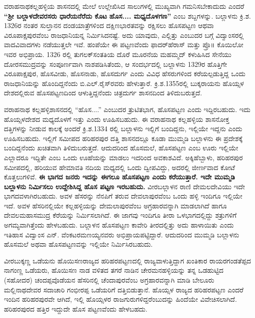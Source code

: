 ವರಾಹನಾಥಕಲ್ಲಹಳ್ಳಿಯ ಶಾಸನದಲ್ಲಿ ಮೇಲೆ ಉಲ್ಲೇಖಿಸಿದ ಸಾಲುಗಳಲ್ಲಿ ಮುಖ್ಯವಾಗಿ ಗಮನಿಸಬೇಕಾದುದು ಎಂದರೆ \textbf{“ಶ‍್ರೀ ಬಲ್ಲಾಳದೇವರಸರು ಧಾರೆಯನೆರೆದು ಕೊಟ} \textbf{ಹೊಸ.... ಮಧ್ಯದೊಳಗಣ” }ಎಂಬ ಶಬ್ದಗಳನ್ನು. ಬಲ್ಲಾಳನು ಕ್ರಿ.ಶ. 1326ರ ನಂತರ ಸುಲ್ತಾನನ ದಂಡಯಾತ್ರೆಗಳಿಂದ ದಕ್ಷಿಣಭಾರತವನ್ನು ರಕ್ಷಿಸಲು ಹೊಸಪಟ್ಟಣ ಆಥವಾ ವಿರೂಪಾಕ್ಷಪುರ\-ವೆಂಬ ರಾಜಧಾನಿಯನ್ನ ನಿರ್ಮಿಸಿದನಷ್ಟೆ. ಅದು ಯಾವುದು, ಎಲ್ಲಿತ್ತು ಎಂಬುದರ ಬಗ್ಗೆ ವಿದ್ವಾಂಸರಲ್ಲಿ ವಾದವಿವಾದಗಳು ನಡೆಯುತ್ತಲೇ ಇವೆ. ಹಂಪೆಯೇ ಈ ಪಟ್ಟಣವೆಂದು ಫಾದರ್​ಹೆರಾಸ್​ ಮತ್ತು ಪ್ರೊ॥ ಕೊಯಿಲೋ ಇವರ ಅಭಿಪ್ರಾಯ. 1326 ರಲ್ಲಿ ತುಗಲಕ್​ ಸಂತತಿಯ ದೊರೆ ಮೂರನೆಯ ಮಹಮ್ಮದ್​ ಕಳುಹಿಸಿದ ಸೇನೆಯು ದೋರಸಮುದ್ರವನ್ನು ಸಂಪೂರ್ಣವಾಗಿ ನಾಶಪಡಿಸಿತೆಂದು, ಆ ಸಂದರ್ಭದಲ್ಲಿ ಬಲ್ಲಾಳನು 1329ರ ಹೊತ್ತಿಗೇ ವಿರೂಪಾಕ್ಷಪುರ, ಹೊಸವೀಡು, ಹೊಸನಾಡು, ಹೊಸದುರ್ಗ ಎಂದು ವಿವಿಧ ಹೆಸರುಗಳಿಂದ ಕರೆಯಲ್ಪಡುತ್ತಿದ್ದ ಒಂದು ರಾಜಧಾನಿಯನ್ನು ಹೊಂದಿದ್ದನೆಂದು ಬಿ.ಎಲ್​.ರೈಸ್​\-ರವರು ಹೇಳುತ್ತಾರೆ. ಕ್ರಿ.ಶ.1355ರಲ್ಲಿ ಬುಕ್ಕರಾಯನು ಹೊಯ್ಸಳ ದೇಶದಲ್ಲಿರುವ ಹೊಸಪಟ್ಟಣದಿಂದ ಆಳುತ್ತಿದ್ದನೆಂದು ಚಿತ್ರದುರ್ಗ ಶಾಸನದಿಂದ ತಿಳಿದುಬರುತ್ತದೆ.

ವರಾಹನಾಥ ಕಲ್ಲಹಳ್ಳಿಶಾಸನದಲ್ಲಿ “ಹೊಸ....” ಎಂಬುದರ ತ್ರುಟಿತಭಾಗ, ಹೊಸಪಟ್ಟಣ ಎಂದು ಇದ್ದಿರಬಹುದು. ಇದು ಹೊಯ್ಸಳದೇಶದ ಮಧ್ಯದೊಳಗೆ ಇತ್ತು ಎಂದು ಊಹಿಸಬಹುದು. ಈ ವರಾಹನಾಥ ಕಲ್ಲಹಳ್ಳಿಯ ಶಾಸನೋಕ್ತ ದತ್ತಿಗಳನ್ನು ನೀಡುವ ಕಾಲಕ್ಕೆ ಅಂದರೆ ಕ್ರಿ.ಶ.1334 ರಲ್ಲಿ ಬಲ್ಲಾಳನು ಇಲ್ಲಿಗೆ ಬಂದಿದ್ದನು, ಇಲ್ಲಿಯೇ ಇದ್ದನು ಎಂದು ಊಹಿಸಬಹುದು. ಇಲ್ಲಿಗೆ ಸಮೀಪದ ಹರಿಹರಪುರ ದತ್ತಿ ಶಾಸನದಲ್ಲೂ ಕೂಡಾ ಮುಮ್ಮಡಿ ಬಲ್ಲಾಳನು ಈ ಪ್ರದೇಶಕ್ಕೆ ಬಂದಿದ್ದನೆಂದು ಖಚಿತವಾಗಿ ತಿಳಿದುಬರುತ್ತದೆ. ಆದುದರಿಂದ ಹೊಸಮಲೆ, ಹೊಸಪಟ್ಟಣ ಎಂಬ ಊರು ಇಲ್ಲಿಯೇ ಎಲ್ಲಾದರೂ ಇದ್ದಿತೇ ಎಂಬ ಒಂದು ಊಹೆಯನ್ನು ಮಾಡಲು ಇದರಿಂದ ಅವಕಾಶವಿದೆ. ಅಕ್ಕಿಹೆಬ್ಬಾಳು, ಹರಿಹರಪುರ ಸಮೀಪದಲ್ಲಿ, ಹರಿಯುವ ಹೇಮಾವತಿ ನದಿಯ ಮಧ್ಯದಲ್ಲಿ ಒಂದು ದ್ವೀಪವಿದ್ದು, ಅದರಲ್ಲಿ ಜೀರ್ಣವಾದ ಕೋಟೆ ಕೊತ್ತಲುಗಳಿವೆ. \textbf{ಈ ಭಾಗದ ಜನರು ಇದನ್ನು ಈಗಲೂ ಹೊಸಪಟ್ಟಣ ಎಂದು ಕರೆಯುತ್ತಾರೆ. ಇದೇ ಮುಮ್ಮಡಿ ಬಲ್ಲಾಳನು ನಿರ್ಮಿಸಲು ಉದ್ದೇಶಿಸಿದ್ದ ಹೊಸ ಪಟ್ಟಣ ಇರಬಹುದು.} ವೀರಬಲ್ಲಾಳನ ರಾಣಿ ದೇಮಲದೇವಿಯು ಇದೇ ಭಾಗದವಳಾಗಿರಬಹುದು. ಅವಳ ಹೆಸರನ್ನು ನೆನಪಿಗೆ ತರುವ ದೇವಲಾಪುರವೆಂಬ ಒಂದು ಹಳ್ಳಿ ಇಂದಿಗೂ ಇಲ್ಲಿಯೇ ಇದೆ. ಅವಳ ಹೆಸರಿನಲ್ಲಿಯೇ ಕಲ್ಲಹಳ್ಳಿಯನ್ನು ದೇಮಲಾಪುರವೆಂಬ ಅಗ್ರಹಾರವನ್ನಾಗಿ ಮಾಡಲಾಗಿದೆ ಹಾಗೂ ದೇವಲಮಹಾಸಮುದ್ರ ಕೆರೆಯನ್ನು ನಿರ್ಮಿಸಲಾಗಿದೆ. ಈ ಜಾಗವು ಇಂದಿಗೂ ತೀರಾ ಒಳಭಾಗದಲ್ಲಿದ್ದು ಶತ್ರುಗಳಿಗೆ ಅಗಮ್ಯವಾಗಿತ್ತೆಂದು ಹೇಳಬಹುದು. ಬಲ್ಲಾಳನ ಹೊಸಪಟ್ಟಣ ಕಾವೇರಿ ತೀರದಲ್ಲಿತ್ತು ಅದು ಹಾಳಾಯಿತು ಎಂದು ಇತಿಹಾಸ ವಿದ್ವಾಂಸ ಎನ್​. ವೆಂಕಟರಮಣಯ್ಯನವರು ಅಭಿಪ್ರಾಯಪಟ್ಟಿದ್ದಾರೆ. ಆದುದರಿಂದ ಮುಮ್ಮಡಿ ಬಲ್ಲಾಳನು ಹೊಸಮಲೆ ಅಥವಾ ಹೊಸಪಟ್ಟಣವನ್ನು ಇಲ್ಲಿಯೇ ನಿರ್ಮಿಸಿರಬಹುದು. 

ವೀರಬುಕ್ಕಣ್ಣ ಒಡೆಯನು ಹೊಯಿಸಣರಾಜ್ಯದ ಹರಿಹರಪಟ್ಟಣದಲ್ಲಿ ರಾಜ್ಯವಾಳುತ್ತಿದ್ದಾಗ ಖಂತಿಕಾರ ರಾಯರಗಂಡ\break ತೆಪ್ಪದ ನಾಗಂಣ್ಣ ಒಡೆಯರು, ಹೊಯಿಸಣ ನಾಡ ವಳಿತದ ತಗರೆ ನಾಡಿನ ಚೇರಮನಹಳ್ಳಿಯನ್ನು ತನ್ನ ಒಡಹುಟ್ಟಿದ (ಸಹೋದರ) ಚಂದಪ್ಪವೊಡೆಯನ ಹೆಸರಿನಲ್ಲಿ ಚೆಂದಾಪುರವೆಂಬ ಅಗ್ರಹಾರವನ್ನಾಗಿ ಮಾಡಿ ಬೇಲೂರು ಮಲ್ಲಿನಾಥದೇವರ ಸದಾಚಾರಿ ಗಂಭೀರಪ್ಪ ಒಡೆಯರಿಗೆ ದತ್ತಿಬಿಡುತ್ತಾನೆ. ಹೊಯ್ಸಳ ರಾಜ್ಯದ ಹರಿಹರಪಟ್ಟಣ ಎಂದರೆ ಇಂದಿನ ಹರಿಹರಪುರವೇ ಆಗಿದೆ, ಇಲ್ಲಿ ಹೊಯ್ಸಳರ ರಾಜಗುರುಗಳಿದ್ದರೆಂಬುದನ್ನು ಹಿಂದೆಯೇ ವಿವೇಚಿಸಲಾಗಿದೆ. ಹರಿಹರಪುರದ ಹತ್ತಿರ ಇದ್ದುದೇ ಹೊಸ ಪಟ್ಟಣವೆಂದು ಹೇಳಬಹದು. 

